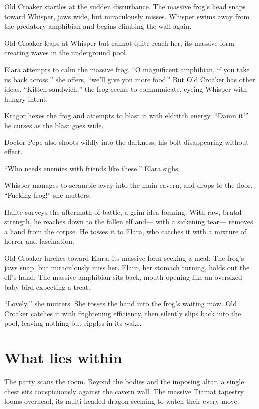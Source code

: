 \documentclass[
  letterpaper,12pt,twoside,twocolumn,openany,
  nodeprecatedcode,bg=full]{dndbook}
\begin{document}
Old Croaker startles at the sudden disturbance. The massive frog's head
snaps toward Whisper, jaws wide, but miraculously misses. Whisper swims
away from the predatory amphibian and begins climbing the wall again.

Old Croaker leaps at Whisper but cannot quite reach her, its massive
form creating waves in the underground pool.

Elara attempts to calm the massive frog. ``O magnificent amphibian, if
you take us back across,'' she offers, ``we'll give you more food.'' But
Old Croaker has other ideas. ``Kitten sandwich,'' the frog seems to
communicate, eyeing Whisper with hungry intent.

Kragor hexes the frog and attempts to blast it with eldritch energy.
``Damn it!'' he curses as the blast goes wide.

Doctor Pepe also shoots wildly into the darkness, his bolt disappearing
without effect.

``Who needs enemies with friends like these,'' Elara sighs.

Whisper manages to scramble away into the main cavern, and drops to the
floor. ``Fucking frog!'' she mutters.

Halite surveys the aftermath of battle, a grim idea forming. With raw,
brutal strength, he reaches down to the fallen elf and--- with a
sickening tear--- removes a hand from the corpse. He tosses it to Elara,
who catches it with a mixture of horror and fascination.

Old Croaker lurches toward Elara, its massive form seeking a meal. The
frog's jaws snap, but miraculously miss her. Elara, her stomach turning,
holds out the elf's hand. The massive amphibian sits back, mouth opening
like an oversized baby bird expecting a treat.

``Lovely,'' she mutters. She tosses the hand into the frog's waiting
maw. Old Croaker catches it with frightening efficiency, then silently
slips back into the pool, leaving nothing but ripples in its wake.

\section{What lies within}\label{what-lies-within}

The party scans the room. Beyond the bodies and the imposing altar, a
single chest sits conspicuously against the cavern wall. The massive
Tiamat tapestry looms overhead, its multi-headed dragon seeming to watch
their every move.
\end{document}
